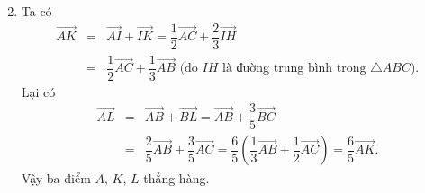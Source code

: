 \begin{bt}
{{		}
		\begin{enumerate}
			\setcounter{enumi}{1}
			\item Ta có
			      \allowdisplaybreaks
			      \begin{eqnarray*}
				      \overrightarrow{AK}&= & \overrightarrow{AI}+\overrightarrow{IK}=\dfrac{1}{2}\overrightarrow{AC}+\dfrac{2}{3}\overrightarrow{IH}\\
				      &= & \dfrac{1}{2}\overrightarrow{AC}+\dfrac{1}{3}\overrightarrow{AB} \text{ (do } IH \text{ là đường trung bình trong } \triangle ABC).
			      \end{eqnarray*}
			      Lại có
			      \allowdisplaybreaks
			      \begin{eqnarray*}
				      \overrightarrow{AL}&= & \overrightarrow{AB}+\overrightarrow{BL}=\overrightarrow{AB}+\dfrac{3}{5}\overrightarrow{BC}\\
				      &= & \dfrac{2}{5}\overrightarrow{AB}+\dfrac{3}{5}\overrightarrow{AC}=\dfrac{6}{5}\left(\dfrac{1}{3}\overrightarrow{AB}+\dfrac{1}{2}\overrightarrow{AC}\right)=\dfrac{6}{5}\overrightarrow{AK}.
			      \end{eqnarray*}
			      Vậy ba điểm $A$, $K$, $L$ thẳng hàng.
		\end{enumerate}
	}
\end{bt}

